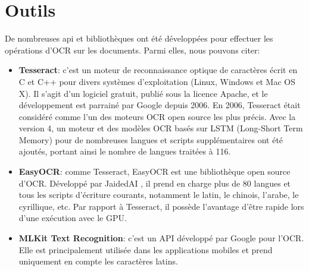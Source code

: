 \section{Outils}
De nombreuses \acrshort{api} et bibliothèques ont été développées pour effectuer les opérations d’OCR sur les documents. Parmi elles, nous pouvons citer:

\begin{itemize}
    \item \textbf{Tesseract}: c’est un moteur de reconnaissance optique de caractères écrit en C et C++ pour divers systèmes d'exploitation (Linux, Windows et Mac OS X). Il s'agit d'un logiciel gratuit, publié sous la licence Apache, et le développement est parrainé par Google depuis 2006. En 2006, Tesseract était considéré comme l'un des moteurs OCR open source les plus précis. Avec la version 4, un moteur et des modèles OCR basés sur LSTM (Long-Short Term Memory) pour de nombreuses langues et scripts supplémentaires ont été ajoutés, portant ainsi le nombre de langues traitées à 116.
    \item \textbf{EasyOCR}: comme Tesseract, EasyOCR est une bibliothèque  open source d’OCR. Développé par JaidedAI , il prend en charge plus de 80 langues et tous les scripts d'écriture courants, notamment le latin, le chinois, l'arabe, le cyrillique, etc. Par rapport à Tesseract, il possède l’avantage d’être rapide lors d’une exécution avec le GPU.
    \item \textbf{MLKit Text Recognition}: 
    c’est un API développé par Google pour l’OCR. Elle est principalement utilisée dans les applications mobiles et prend uniquement en compte les caractères latins.
    
\end{itemize}
